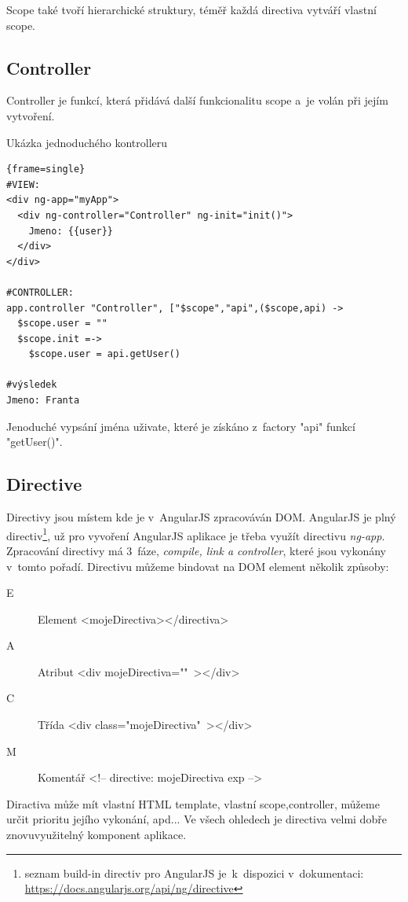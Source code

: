 \documentclass[a4paper,12pt,twoside,BCOR=10mm]{article}
\renewcommand{\it}[1]{\textit{#1}}    %
\newenvironment{codeframe}{%
  \begin{Sbox} 
    \begin{minipage} 
      {\columnwidth-\leftmargin-\rightmargin-2\fboxsep-2\fboxrule-4pt} 
}{%

  \end{minipage} 
  \end{Sbox} 
  \begin{center} 
    \fcolorbox{black}{codeback}{\TheSbox} 
  \end{center} 
}
\begin{document}
Scope také tvoří hierarchické struktury, téměř každá directiva vytváří vlastní scope.

\subsection{Controller}
Controller je funkcí, která přidává další funkcionalitu scope a~je volán při jejím vytvoření.\cite{ngBOOK}

Ukázka jednoduchého kontrolleru
     \begin{codeframe} 
      \begin{Verbatim}{frame=single}
#VIEW:
<div ng-app="myApp">
  <div ng-controller="Controller" ng-init="init()">
    Jmeno: {{user}}
  </div>
</div>

#CONTROLLER:
app.controller "Controller", ["$scope","api",($scope,api) ->
  $scope.user = ""
  $scope.init =->
    $scope.user = api.getUser()

#výsledek
Jmeno: Franta
\end{Verbatim} 
    \end{codeframe}
Jenoduché vypsání jména uživate, které je získáno z~factory "api" funkcí "getUser()".

\subsection{Directive}
Directivy jsou místem kde je v~AngularJS zpracováván DOM. AngularJS je plný directiv\footnote{seznam build-in directiv pro AngularJS je~k~dispozici v~dokumentaci: \href{https://docs.angularjs.org/api/ng/directive}{https://docs.angularjs.org/api/ng/directive}}, už pro vyvoření AngularJS aplikace je třeba využít directivu \it{ng-app}.\cite{ngBOOK}\\

Zpracování directivy má 3~fáze, \it{compile, link a controller}, které jsou vykonány v~tomto pořadí. Directivu můžeme bindovat na DOM element několik způsoby\cite{ngBOOK}:
\begin{description}
\item[E] Element <mojeDirectiva></directiva>
\item[A] Atribut <div mojeDirectiva=""~></div>
\item[C] Třída <div class="mojeDirectiva"~></div>
\item[M] Komentář <!-- directive: mojeDirectiva exp -->
 \end{description}

 Diractiva může mít vlastní HTML template, vlastní scope,controller, můžeme určit prioritu jejího vykonání, apd... Ve všech ohledech je directiva velmi dobře znovuvyužitelný komponent aplikace.\cite{ngBOOK}\\
\end{document}
